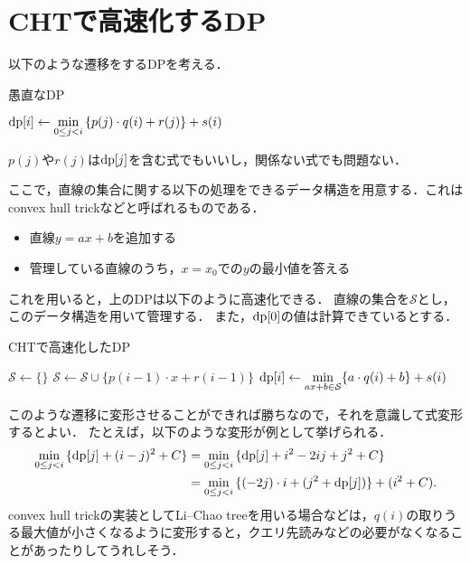 \documentclass{jsarticle}
\newcommand{\DP}{\ensuremath\mathrm{dp}}
\begin{document}
\section{CHTで高速化するDP}

以下のような遷移をするDPを考える．
\begin{alg}
  \caption{愚直なDP}
  {
    {$\displaystyle\DP[i] \gets \min_{0\le j < i}\,\{p(j)\cdot q(i) + r(j)\} + s(i)$}\;
  }
\end{alg}

\noindent
$p(j)$や$r(j)$は$\DP[j]$を含む式でもいいし，関係ない式でも問題ない．

ここで，直線の集合に関する以下の処理をできるデータ構造を用意する．これはconvex hull trickなどと呼ばれるものである．
\begin{itemize}
\item 直線$y=ax+b$を追加する
\item 管理している直線のうち，$x=x_0$での$y$の最小値を答える
\end{itemize}

これを用いると，上のDPは以下のように高速化できる．
直線の集合を$\mathcal{S}$とし，このデータ構造を用いて管理する．
また，$\DP[0]$の値は計算できているとする．
\begin{alg}
  \caption{CHTで高速化したDP}
  {$\mathcal{S} \gets \{\}$}\;
  {
    {$\mathcal{S} \gets \mathcal{S} \cup \{p(i-1)\cdot x+r(i-1)\}$}\;
    {$\displaystyle\DP[i] \gets \min_{ax+b\in\mathcal{S}} \{a\cdot q(i)+b\}+s(i)$}\;
  }
\end{alg}

このような遷移に変形させることができれば勝ちなので，それを意識して式変形するとよい．
たとえば，以下のような変形が例として挙げられる．
\begin{align*}
  \min_{0\le j < i}\,\{\DP[j] + (i-j)^2 + C\}
  &= \min_{0\le j < i}\,\{\DP[j] + i^2-2ij+j^2+C\}\\
  &= \min_{0\le j < i}\,\{(-2j)\cdot i + (j^2+\DP[j])\} + (i^2+C).
\end{align*}
convex hull trickの実装としてLi--Chao treeを用いる場合などは，$q(i)$の取りうる最大値が小さくなるように変形すると，クエリ先読みなどの必要がなくなることがあったりしてうれしそう．
\end{document}
